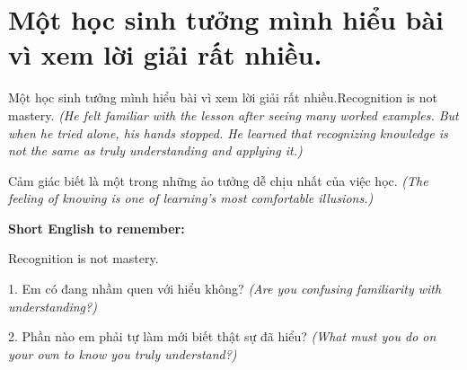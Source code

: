 \section{Một học sinh tưởng mình hiểu bài vì xem lời giải rất nhiều.}
\begin{truyen}{Một học sinh tưởng mình hiểu bài vì xem lời giải rất nhiều.}{Recognition is not mastery.}
\textit{(He felt familiar with the lesson after seeing many worked examples. But when he tried alone, his hands stopped. He learned that recognizing knowledge is not the same as truly understanding and applying it.)}
\end{truyen}
\begin{baihoc}
Cảm giác biết là một trong những ảo tưởng dễ chịu nhất của việc học.
\textit{(The feeling of knowing is one of learning's most comfortable illusions.)}
\end{baihoc}
\begin{ghinhoanh}
\textbf{Short English to remember:}

Recognition is not mastery.
\end{ghinhoanh}
\begin{tuhocnhanh}
1. Em có đang nhầm quen với hiểu không? \textit{(Are you confusing familiarity with understanding?)}

2. Phần nào em phải tự làm mới biết thật sự đã hiểu? \textit{(What must you do on your own to know you truly understand?)}
\end{tuhocnhanh}
\ngancach

